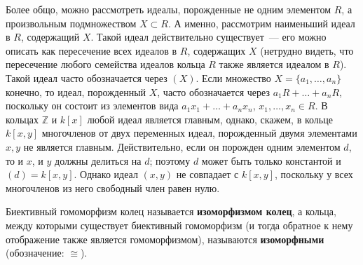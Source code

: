 \documentclass[a4paper,11pt]{scrartcl}
\theoremstyle{plain}
\theoremstyle{definition}
\newcommand\dfn[1]{\textbf{#1}}
\newcommand\mb{\mathbb}
\newcommand\isom{\cong}
\begin{document}
Более общо, можно рассмотреть
идеалы, порожденные не одним элементом $R$, а произвольным
подмножеством $X\subset R$. А именно, рассмотрим наименьший идеал в
$R$, содержащий $X$. Такой идеал действительно существует~--- его
можно описать как пересечение всех идеалов в $R$, содержащих $X$
(нетрудно видеть, что пересечение любого семейства идеалов кольца $R$
также является идеалом в $R$). Такой идеал часто обозначается через
$(X)$. Если множество $X=\{a_1,\dots,a_n\}$ конечно, то идеал,
порожденный $X$, часто обозначается через $a_1R+\dots+a_nR$, поскольку он
состоит из элементов вида $a_1x_1+\dots+a_nx_n$, $x_1,\dots,x_n\in R$.
В кольцах $\mb Z$ и $k[x]$ любой идеал является главным, однако,
скажем, в кольце $k[x,y]$ многочленов от двух переменных идеал,
порожденный двумя элементами $x,y$ не является главным. Действительно,
если он порожден одним элементом $d$, то и $x$, и $y$ должны делиться
на $d$; поэтому $d$ может быть только константой и
$(d)=k[x,y]$. Однако идеал $(x,y)$ не совпадает с $k[x,y]$, поскольку
у всех многочленов из него свободный член равен нулю.

Биективный гомоморфизм колец называется
\dfn{изоморфизмом колец}, а кольца, между которыми существует
биективный гомоморфизм (и тогда обратное к нему отображение также
является гомоморфизмом), называются \dfn{изоморфными} (обозначение:
$\isom$).
\end{document}
